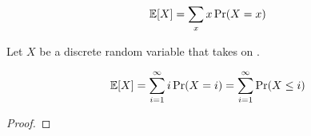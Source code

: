 
\begin{frame}{}
  \centerline{}

  \begin{definition}[Expectation]
    \[
      \operatorname*{\mathbb{E}}[X] = \sum_{x} x \Pr(X = x)
    \]
  \end{definition}
\end{frame}

\begin{frame}{}
  \centerline{}

  \begin{theorem}
    Let $X$ be a discrete random variable that takes on .

    \[
      \operatorname*{\mathbb{E}}[X] = \sum_{i=1}^{\infty} i \Pr(X = i) = \sum_{i=1}^{\infty} \Pr(X \le i)
    \]
  \end{theorem}

  \pause
  \begin{proof}
  \end{proof}
\end{frame}



